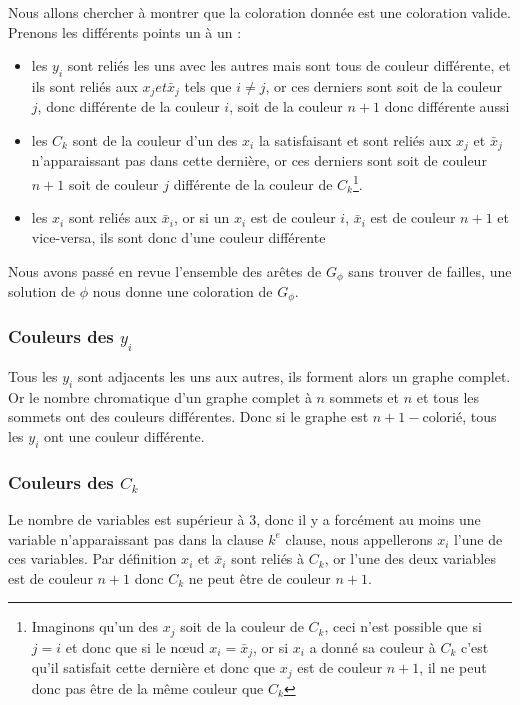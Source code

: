 Nous allons chercher à montrer que la coloration donnée est une coloration valide.
Prenons les différents points un à un : 
\begin{itemize}
	\item les $y_i$ sont reliés les uns avec les autres mais sont tous de couleur différente, et ils
		sont reliés aux $x_j et \bar x_j$ tels que $i \not = j$, or ces derniers sont soit de la couleur
		$j$, donc différente de la couleur $i$, soit de la couleur $n+1$ donc différente aussi
	\item les $C_k$ sont de la couleur d'un des $x_i$ la satisfaisant et sont reliés aux $x_j$ et
		$\bar x_j$ n'apparaissant pas dans cette dernière, or ces derniers sont soit de couleur $n+1$
		soit de couleur $j$ différente de la couleur de $C_k$\footnote{Imaginons qu'un des $x_j$ soit de
			la couleur de $C_k$, ceci n'est possible que si $j = i$ et donc que si le n\oe ud $x_i = \bar
			x_j$, or si $x_i$ a donné sa couleur à $C_k$ c'est qu'il satisfait cette dernière et donc que
		$x_j$ est de couleur $n+1$, il ne peut donc pas être de la même couleur que $C_k$ }.
	\item les $x_i$ sont reliés aux $\bar x_i$, or si un $x_i$ est de couleur $i$, $\bar x_i$ est de
		couleur $n+1$ et vice-versa, ils sont donc d'une couleur différente
\end{itemize}

Nous avons passé en revue l'ensemble des arêtes de $G_\phi$ sans trouver de failles, une solution de
$\phi$ nous donne une coloration de $G_\phi$.

\subsubsection{Couleurs des $y_i$}

Tous les $y_i$ sont adjacents les uns aux autres, ils forment alors un graphe complet. Or le nombre
chromatique d'un graphe complet à $n$ sommets et $n$ et tous les sommets ont des couleurs
différentes. Donc si le graphe est $n+1-$colorié, tous les $y_i$ ont une couleur différente.

\subsubsection{Couleurs des $C_k$}

Le nombre de variables est supérieur à 3, donc il y a forcément au moins une variable n'apparaissant
pas dans la clause $k^e$ clause, nous appellerons $x_i$ l'une de ces variables. Par définition $x_i$
et $\bar x_i$ sont reliés à $C_k$, or l'une des deux variables est de couleur $n+1$ donc $C_k$ ne
peut être de couleur $n+1$.

